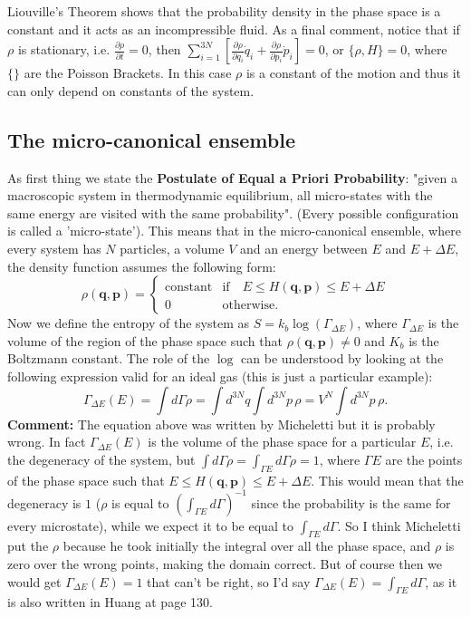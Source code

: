 Liouville's Theorem shows that the probability density in the phase space is a constant and it acts as an incompressible fluid. As a final comment, notice that if $\rho$ is stationary, i.e. $\frac{\partial\rho}{\partial t} = 0$, then $\sum_{i=1}^{3N}\left[\frac{\partial\rho}{\partial q_i}\dot{q}_i+\frac{\partial\rho}{\partial p_i}\dot{p}_i\right] = 0$, or $\{\rho,H\}=0$, where $\{ \}$ are the Poisson Brackets. In this case $\rho$ is a constant of the motion and thus it can only depend on constants of the system.
\subsection{The micro-canonical ensemble}
As first thing we state the \textbf{Postulate of Equal a Priori Probability}: "given a macroscopic system in thermodynamic equilibrium, all micro-states with the same energy are visited with the same probability". (Every possible configuration is called a 'micro-state'). This means that in the micro-canonical ensemble, where every system has $N$ particles, a volume $V$ and an energy between $E$ and $E+\Delta E$, the density function assumes the following form:
\begin{equation}
\label{eqn:third}
\rho(\textbf{q},\textbf{p}) = 
\begin{cases}
\text{constant} & \text{if}\quad E \le H(\textbf{q},\textbf{p})\le E+\Delta E\\
0 & \text{otherwise.}
\end{cases}
\end{equation}
Now we define the entropy of the system as $S = k_b \log(\Gamma_{\Delta E})$, where $\Gamma_{\Delta E}$ is the volume of the region of the phase space such that $\rho(\textbf{q},\textbf{p})\neq 0$ and $K_b$ is the Boltzmann constant. The role of the $\log$ can be understood by looking at the following expression valid for an ideal gas (this is just a particular example):
\[
\Gamma_{\Delta E}(E) = \int d\Gamma\rho = \int d^{3N}q\int d^{3N}p\,\rho = V^N \int d^{3N}p\,\rho.
\]
\textbf{Comment:} The equation above was written by Micheletti but it is probably wrong. In fact $\Gamma_{\Delta E}(E)$ is the volume of the phase space for a particular $E$, i.e. the degeneracy of the system, but $\int d\Gamma\rho = \int_{\Gamma E} d\Gamma\rho = 1$, where $\Gamma E$ are the points of the phase space such that $E \le H(\textbf{q},\textbf{p})\le E+\Delta E$. This would mean that the degeneracy is $1$ ($\rho$ is equal to $\left(\int_{\Gamma E} d\Gamma\right)^{-1}$ since the probability is the same for every microstate), while we expect it to be equal to $\int_{\Gamma E} d\Gamma$. So I think Micheletti put the $\rho$ because he took initially the integral over all the phase space, and $\rho$ is zero over the wrong points, making the domain correct. But of course then we would get $\Gamma_{\Delta E}(E) = 1$ that can't be right, so I'd say $\Gamma_{\Delta E}(E) = \int_{\Gamma E} d\Gamma$, as it is also written in Huang at page 130.\\


